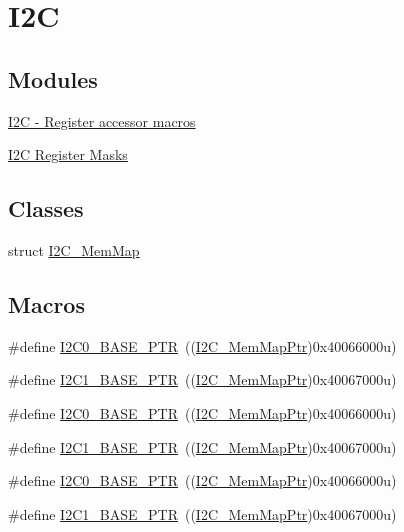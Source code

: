 \hypertarget{group___i2_c___peripheral}{}\section{I2C}
\label{group___i2_c___peripheral}
\subsection*{Modules}
\begin{DoxyCompactItemize}
\item 
\hyperlink{group___i2_c___register___accessor___macros}{I2\+C -\/ Register accessor macros}
\item 
\hyperlink{group___i2_c___register___masks}{I2\+C Register Masks}
\end{DoxyCompactItemize}
\subsection*{Classes}
\begin{DoxyCompactItemize}
\item 
struct \hyperlink{struct_i2_c___mem_map}{I2\+C\+\_\+\+Mem\+Map}
\end{DoxyCompactItemize}
\subsection*{Macros}
\begin{DoxyCompactItemize}
\item 
\#define \hyperlink{group___i2_c___peripheral_ga6db92fda81fa3b6a1c8c6a85e66d51a0}{I2\+C0\+\_\+\+B\+A\+S\+E\+\_\+\+P\+TR}~((\hyperlink{group___i2_c___peripheral_ga9902bc02a12982d0c37ec011b4dd89f0}{I2\+C\+\_\+\+Mem\+Map\+Ptr})0x40066000u)
\item 
\#define \hyperlink{group___i2_c___peripheral_gae13da5d584f2a4e2379db927a3f18772}{I2\+C1\+\_\+\+B\+A\+S\+E\+\_\+\+P\+TR}~((\hyperlink{group___i2_c___peripheral_ga9902bc02a12982d0c37ec011b4dd89f0}{I2\+C\+\_\+\+Mem\+Map\+Ptr})0x40067000u)
\item 
\#define \hyperlink{group___i2_c___peripheral_ga6db92fda81fa3b6a1c8c6a85e66d51a0}{I2\+C0\+\_\+\+B\+A\+S\+E\+\_\+\+P\+TR}~((\hyperlink{group___i2_c___peripheral_ga9902bc02a12982d0c37ec011b4dd89f0}{I2\+C\+\_\+\+Mem\+Map\+Ptr})0x40066000u)
\item 
\#define \hyperlink{group___i2_c___peripheral_gae13da5d584f2a4e2379db927a3f18772}{I2\+C1\+\_\+\+B\+A\+S\+E\+\_\+\+P\+TR}~((\hyperlink{group___i2_c___peripheral_ga9902bc02a12982d0c37ec011b4dd89f0}{I2\+C\+\_\+\+Mem\+Map\+Ptr})0x40067000u)
\item 
\#define \hyperlink{group___i2_c___peripheral_ga6db92fda81fa3b6a1c8c6a85e66d51a0}{I2\+C0\+\_\+\+B\+A\+S\+E\+\_\+\+P\+TR}~((\hyperlink{group___i2_c___peripheral_ga9902bc02a12982d0c37ec011b4dd89f0}{I2\+C\+\_\+\+Mem\+Map\+Ptr})0x40066000u)
\item 
\#define \hyperlink{group___i2_c___peripheral_gae13da5d584f2a4e2379db927a3f18772}{I2\+C1\+\_\+\+B\+A\+S\+E\+\_\+\+P\+TR}~((\hyperlink{group___i2_c___peripheral_ga9902bc02a12982d0c37ec011b4dd89f0}{I2\+C\+\_\+\+Mem\+Map\+Ptr})0x40067000u)
\end{DoxyCompactItemize}
